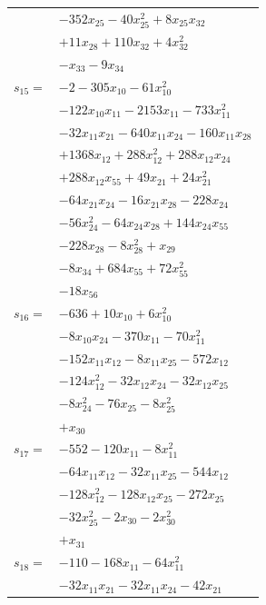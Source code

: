 \begin{longtable}{@{}r@{\;}l@{}}
 & \(\displaystyle -352x_{25} -40x_{25}^{2} +8x_{25}x_{32}\) \\
 & \(\displaystyle +11x_{28} +110x_{32} +4x_{32}^{2}\) \\
 & \(\displaystyle -x_{33} -9x_{34}\) \\[3pt]
\(s_{15}=\) & \(\displaystyle -2 -305x_{10} -61x_{10}^{2}\) \\
 & \(\displaystyle -122x_{10}x_{11} -2153x_{11} -733x_{11}^{2}\) \\
 & \(\displaystyle -32x_{11}x_{21} -640x_{11}x_{24} -160x_{11}x_{28}\) \\
 & \(\displaystyle +1368x_{12} +288x_{12}^{2} +288x_{12}x_{24}\) \\
 & \(\displaystyle +288x_{12}x_{55} +49x_{21} +24x_{21}^{2}\) \\
 & \(\displaystyle -64x_{21}x_{24} -16x_{21}x_{28} -228x_{24}\) \\
 & \(\displaystyle -56x_{24}^{2} -64x_{24}x_{28} +144x_{24}x_{55}\) \\
 & \(\displaystyle -228x_{28} -8x_{28}^{2} +x_{29}\) \\
 & \(\displaystyle -8x_{34} +684x_{55} +72x_{55}^{2}\) \\
 & \(\displaystyle -18x_{56}\) \\[3pt]
\(s_{16}=\) & \(\displaystyle -636 +10x_{10} +6x_{10}^{2}\) \\
 & \(\displaystyle -8x_{10}x_{24} -370x_{11} -70x_{11}^{2}\) \\
 & \(\displaystyle -152x_{11}x_{12} -8x_{11}x_{25} -572x_{12}\) \\
 & \(\displaystyle -124x_{12}^{2} -32x_{12}x_{24} -32x_{12}x_{25}\) \\
 & \(\displaystyle -8x_{24}^{2} -76x_{25} -8x_{25}^{2}\) \\
 & \(\displaystyle +x_{30}\) \\[3pt]
\(s_{17}=\) & \(\displaystyle -552 -120x_{11} -8x_{11}^{2}\) \\
 & \(\displaystyle -64x_{11}x_{12} -32x_{11}x_{25} -544x_{12}\) \\
 & \(\displaystyle -128x_{12}^{2} -128x_{12}x_{25} -272x_{25}\) \\
 & \(\displaystyle -32x_{25}^{2} -2x_{30} -2x_{30}^{2}\) \\
 & \(\displaystyle +x_{31}\) \\[3pt]
\(s_{18}=\) & \(\displaystyle -110 -168x_{11} -64x_{11}^{2}\) \\
 & \(\displaystyle -32x_{11}x_{21} -32x_{11}x_{24} -42x_{21}\) \\

\end{longtable}
